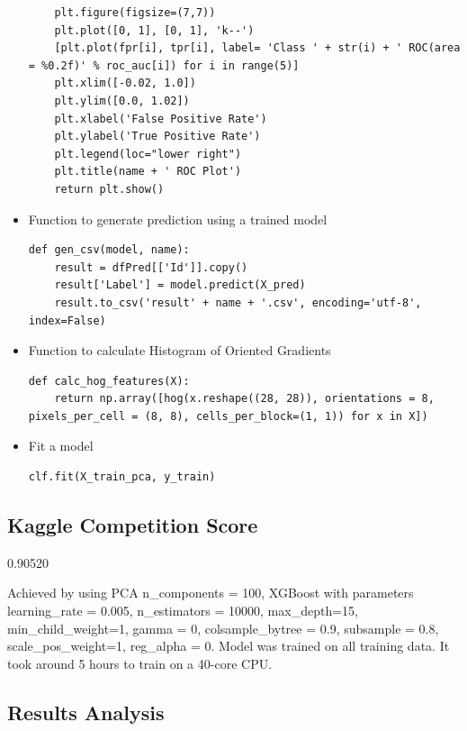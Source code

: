 \documentclass[12pt]{article}
\begin{document}
\begin{singlespacing}
\begin{itemize}
\begin{verbatim}
    plt.figure(figsize=(7,7))
    plt.plot([0, 1], [0, 1], 'k--')
    [plt.plot(fpr[i], tpr[i], label= 'Class ' + str(i) + ' ROC(area = %0.2f)' % roc_auc[i]) for i in range(5)]
    plt.xlim([-0.02, 1.0])
    plt.ylim([0.0, 1.02])
    plt.xlabel('False Positive Rate')
    plt.ylabel('True Positive Rate')
    plt.legend(loc="lower right")
    plt.title(name + ' ROC Plot')
    return plt.show()  
\end{verbatim}

\item Function to generate prediction using a trained model
\begin{verbatim}
def gen_csv(model, name):
    result = dfPred[['Id']].copy()
    result['Label'] = model.predict(X_pred)
    result.to_csv('result' + name + '.csv', encoding='utf-8', index=False) 
\end{verbatim}

\item Function to calculate Histogram of Oriented Gradients
\begin{verbatim}
def calc_hog_features(X):
    return np.array([hog(x.reshape((28, 28)), orientations = 8, pixels_per_cell = (8, 8), cells_per_block=(1, 1)) for x in X])
\end{verbatim}

\item Fit a model
\begin{verbatim}
clf.fit(X_train_pca, y_train)
\end{verbatim}

\end{itemize}
\end{singlespacing}
\subsection{Kaggle Competition Score}

0.90520

Achieved by using PCA n\_components = 100, XGBoost with parameters learning\_rate = 0.005, n\_estimators = 10000, max\_depth=15, min\_child\_weight=1, gamma = 0, colsample\_bytree = 0.9, subsample = 0.8, scale\_pos\_weight=1, reg\_alpha = 0. Model was trained on all training data. It took around 5 hours to train on a 40-core CPU.

\subsection{Results Analysis}
\end{document}
